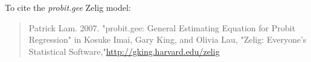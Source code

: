 To cite the \emph{ probit.gee } Zelig model:
 \begin{verse}
 Patrick Lam. 2007. "probit.gee: General Estimating Equation for Probit Regression" in Kosuke Imai, Gary King, and Olivia Lau, "Zelig: Everyone's Statistical Software,"\url{http://gking.harvard.edu/zelig} 
\end{verse}